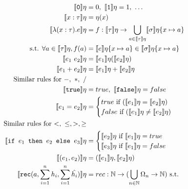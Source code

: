  \begin{figure}
 \begin{align*}
 \llbracket \texttt{0} \rrbracket\eta &= 0, \  \llbracket \texttt{1} \rrbracket\eta = 1, \ \ldots \\
  \llbracket x : \tau \rrbracket\eta &= \eta(x) \\
  \llbracket \lambda (x : \tau) . e \rrbracket\eta &= f : \llbracket \tau \rrbracket\eta 
  \rightarrow \bigcup_{a \in \llbracket \tau \rrbracket\eta} \llbracket \sigma \rrbracket\eta\{x\mapsto a\} \\
\text{ s.t. } \forall a \in \llbracket \tau \rrbracket\eta, f(a) &= \llbracket e \rrbracket\eta\{ x \mapsto a \} 
  \in \llbracket \sigma \rrbracket\eta\{x\mapsto a\}\\
 \llbracket e_1 \ e_2 \rrbracket \eta &= \llbracket e_1 \rrbracket\eta ( \llbracket e_2 \rrbracket\eta ) \\
 \llbracket e_1 + e_2 \rrbracket\eta &= \llbracket e_1 \rrbracket\eta + \llbracket e_2 \rrbracket\eta \\
\text{Similar rules for $-, \ *, \ /$} \\
  \llbracket \texttt{true} \rrbracket\eta &= true, \ \llbracket \texttt{false} \rrbracket\eta = false \\
 \llbracket e_1 = e_2 \rrbracket\eta &= 
 \begin{cases} 
      true \text{ if } (\llbracket e_1 \rrbracket\eta = \llbracket e_2 \rrbracket\eta) \\
      false \text{  if } (\llbracket e_1 \rrbracket\eta \neq \llbracket e_2\rrbracket\eta)\\
   \end{cases} \\
\text{Similar rules for $<, \ \leq, >, \geq$} \\
  \llbracket \ifelse{e_1}{e_2}{e_3} \rrbracket \eta &= 
 \begin{cases} 
      \llbracket e_2 \rrbracket\eta \text{ if } \llbracket e_1 \rrbracket\eta = true \\
      \llbracket e_3 \rrbracket\eta \text{ if } \llbracket e_1 \rrbracket\eta = false \\ 
   \end{cases}
  \\
  \llbracket (e_1,e_2) \rrbracket\eta &= (\llbracket e_1 \rrbracket\eta, \llbracket e_2 \rrbracket\eta) \\
    \llbracket  \texttt{rec} (a,\sum_{i=1}^n h_i,\sum_{i=1}^n \hat{h_i}) \rrbracket\eta &= rec: \N \rightarrow 
    (\bigcup_{n\in \N} \Omega_n \rightarrow \N)   \text{ s.t. }  \\

\end{align*}
\end{figure}
